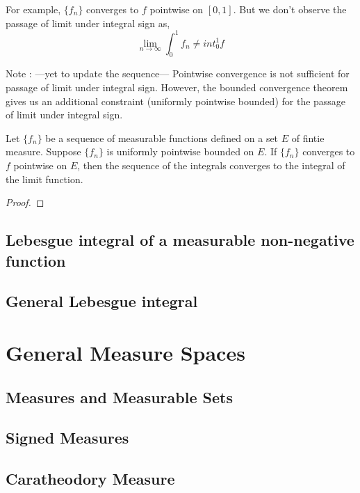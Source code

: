 For example, $\{ f_n \}$ converges to $f$ pointwise on $[0,1]$.
But we don't observe the passage of limit under integral sign as,
$$ \lim_{n \to \infty} \int_0^1 f_n \ne int_0^1 f $$

Note :  ---yet to update the sequence---
Pointwise convergence is not sufficient for passage of limit under integral sign.
However, the bounded convergence theorem gives us an additional constraint (uniformly pointwise bounded) for the passage of limit under integral sign.

\begin{theorem}
	Let $\{ f_n \}$ be a sequence of measurable functions defined on a set $E$ of fintie measure.
	Suppose $\{ f_n \}$ is uniformly pointwise bounded on $E$.
	If $\{ f_n \}$ converges to $f$ pointwise on $E$, then the sequence of the integrals converges to the integral of the limit function.
\end{theorem}
\begin{proof}
\end{proof}

\subsection{Lebesgue integral of a measurable non-negative function}

\subsection{General Lebesgue integral}

\setcounter{section}{16}
\section{General Measure Spaces}
\subsection{Measures and Measurable Sets}
\subsection{Signed Measures}
\subsection{Caratheodory Measure}

